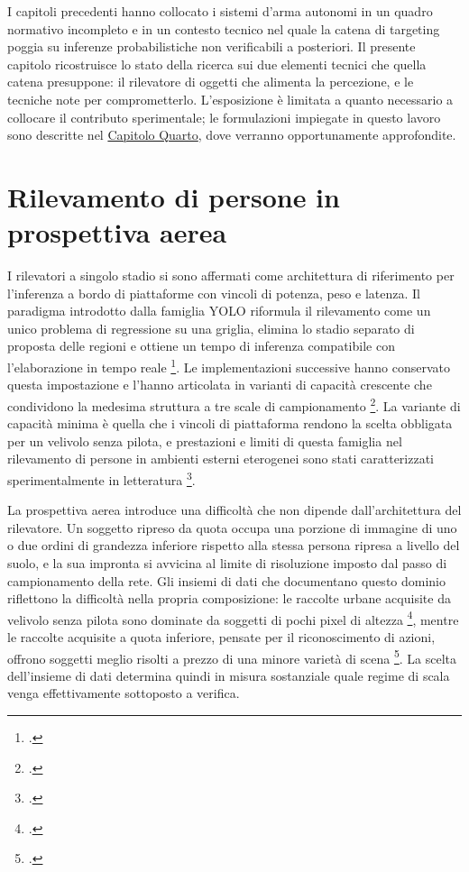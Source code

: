 \documentclass[a4paper,12pt]{report}
\begin{document}
I capitoli precedenti hanno collocato i sistemi d'arma autonomi in un quadro
normativo incompleto e in un contesto tecnico nel quale la catena di targeting
poggia su inferenze probabilistiche non verificabili a posteriori. Il presente
capitolo ricostruisce lo stato della ricerca sui due elementi tecnici che quella
catena presuppone: il rilevatore di oggetti che alimenta la percezione, e le
tecniche note per comprometterlo. L'esposizione è limitata a quanto necessario a
collocare il contributo sperimentale; le formulazioni impiegate in questo lavoro
sono descritte nel \hyperref[cap4]{Capitolo Quarto}, dove verranno opportunamente approfondite.

\section{Rilevamento di persone in prospettiva aerea}
\label{sec:sota_detection}

I rilevatori a singolo stadio si sono affermati come architettura di riferimento
per l'inferenza a bordo di piattaforme con vincoli di potenza, peso e latenza. Il
paradigma introdotto dalla famiglia YOLO riformula il rilevamento come un unico
problema di regressione su una griglia, elimina lo stadio separato di proposta
delle regioni e ottiene un tempo di inferenza compatibile con l'elaborazione in
tempo reale \footcite{redmon_2016_yolo}. Le implementazioni successive hanno
conservato questa impostazione e l'hanno articolata in varianti di capacità
crescente che condividono la medesima struttura a tre scale di campionamento
\footcite{jocher_2023_yolov8}. La variante di capacità minima è quella che i
vincoli di piattaforma rendono la scelta obbligata per un velivolo senza pilota,
e prestazioni e limiti di questa famiglia nel rilevamento di persone in ambienti
esterni eterogenei sono stati caratterizzati sperimentalmente in letteratura
\footcite{sodhro_2025}.

La prospettiva aerea introduce una difficoltà che non dipende dall'architettura
del rilevatore. Un soggetto ripreso da quota occupa una porzione di immagine di
uno o due ordini di grandezza inferiore rispetto alla stessa persona ripresa a
livello del suolo, e la sua impronta si avvicina al limite di risoluzione
imposto dal passo di campionamento della rete. Gli insiemi di dati che
documentano questo dominio riflettono la difficoltà nella propria composizione:
le raccolte urbane acquisite da velivolo senza pilota sono dominate da soggetti
di pochi pixel di altezza \footcite{zhu_2021_visdrone}, mentre le raccolte
acquisite a quota inferiore, pensate per il riconoscimento di azioni, offrono
soggetti meglio risolti a prezzo di una minore varietà di scena
\footcite{barekatain_2017_okutama}. La scelta dell'insieme di dati determina
quindi in misura sostanziale quale regime di scala venga effettivamente
sottoposto a verifica.
\end{document}
